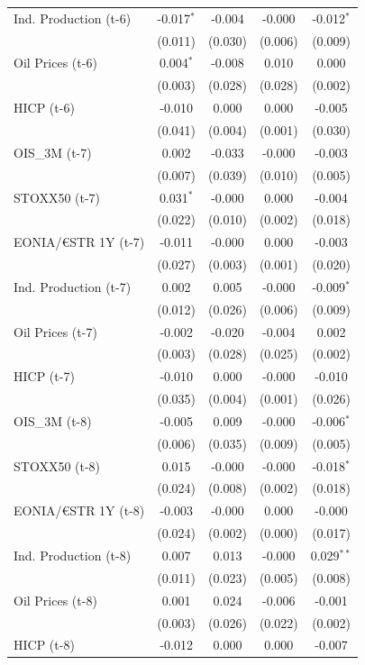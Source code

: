 \begin{longtable}[t]{lcccc}
Ind. Production (t-6) & -0.017$^{*}$ & -0.004 & -0.000 & -0.012$^{*}$\\
 & (0.011) & (0.030) & (0.006) & (0.009)\\
Oil Prices (t-6) & 0.004$^{*}$ & -0.008 & 0.010 & 0.000\\
 & (0.003) & (0.028) & (0.028) & (0.002)\\
HICP (t-6) & -0.010 & 0.000 & 0.000 & -0.005\\
 & (0.041) & (0.004) & (0.001) & (0.030)\\
OIS\_3M (t-7) & 0.002 & -0.033 & -0.000 & -0.003\\
 & (0.007) & (0.039) & (0.010) & (0.005)\\
STOXX50 (t-7) & 0.031$^{*}$ & -0.000 & 0.000 & -0.004\\
 & (0.022) & (0.010) & (0.002) & (0.018)\\
EONIA/€STR 1Y (t-7) & -0.011 & -0.000 & 0.000 & -0.003\\
 & (0.027) & (0.003) & (0.001) & \vphantom{1} (0.020)\\
Ind. Production (t-7) & 0.002 & 0.005 & -0.000 & -0.009$^{*}$\\
 & (0.012) & (0.026) & (0.006) & (0.009)\\
Oil Prices (t-7) & -0.002 & -0.020 & -0.004 & 0.002\\
 & (0.003) & (0.028) & (0.025) & (0.002)\\
HICP (t-7) & -0.010 & 0.000 & -0.000 & -0.010\\
 & (0.035) & (0.004) & (0.001) & (0.026)\\
OIS\_3M (t-8) & -0.005 & 0.009 & -0.000 & -0.006$^{*}$\\
 & (0.006) & (0.035) & (0.009) & (0.005)\\
STOXX50 (t-8) & 0.015 & -0.000 & -0.000 & -0.018$^{*}$\\
 & (0.024) & (0.008) & (0.002) & (0.018)\\
EONIA/€STR 1Y (t-8) & -0.003 & -0.000 & 0.000 & -0.000\\
 & (0.024) & (0.002) & (0.000) & (0.017)\\
Ind. Production (t-8) & 0.007 & 0.013 & -0.000 & 0.029$^{**}$\\
 & (0.011) & (0.023) & (0.005) & (0.008)\\
Oil Prices (t-8) & 0.001 & 0.024 & -0.006 & -0.001\\
 & (0.003) & (0.026) & (0.022) & (0.002)\\
HICP (t-8) & -0.012 & 0.000 & 0.000 & -0.007\\

\end{longtable}
